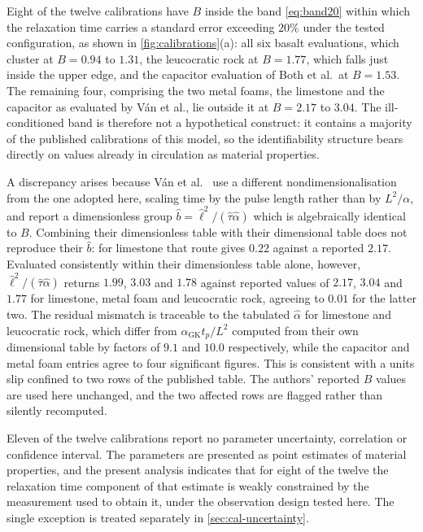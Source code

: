 \documentclass[preprint,12pt,a4paper]{elsarticle}
\theoremstyle{plain}
\theoremstyle{definition}
\theoremstyle{remark}
\newcommand{\Bnum}{B}
\begin{document}
Eight of the twelve calibrations have $\Bnum$ inside the band
\eqref{eq:band20} within which the relaxation time carries a standard error
exceeding $20\%$ under the tested configuration, as shown in \cref{fig:calibrations}(a): all six basalt evaluations,
which cluster at $\Bnum = 0.94$ to $1.31$, the leucocratic rock at
$\Bnum = 1.77$, which falls just inside the upper edge, and the capacitor
evaluation of Both et al.\ at $\Bnum = 1.53$. The remaining four, comprising
the two metal foams, the limestone and the capacitor as evaluated by V\'an
et al., lie outside it at $\Bnum = 2.17$ to $3.04$. The ill-conditioned band is
therefore not a hypothetical construct: it contains a majority of the published
calibrations of this model, so the identifiability structure bears directly on
values already in circulation as material properties.


A discrepancy arises because V\'an et al.\ \cite{Van2017} use a different
nondimensionalisation from the one adopted here, scaling time by the pulse
length rather than by $L^{2}/\alpha$, and report a dimensionless group
$\hat{b} = \hat{\ell}^{2}/(\hat{\tau}\hat{\alpha})$ which is algebraically
identical to $\Bnum$. Combining their dimensionless table with their
dimensional table does not reproduce their $\hat{b}$: for limestone that route
gives $0.22$ against a reported $2.17$. Evaluated consistently within their
dimensionless table alone, however, $\hat{\ell}^{2}/(\hat{\tau}\hat{\alpha})$
returns $1.99$, $3.03$ and $1.78$ against reported values of $2.17$, $3.04$ and
$1.77$ for limestone, metal foam and leucocratic rock, agreeing to $0.01$ for
the latter two. The residual mismatch is traceable to the tabulated
$\hat{\alpha}$ for limestone and leucocratic rock, which differ from
$\alpha_{\mathrm{GK}} t_{p}/L^{2}$ computed from their own dimensional table by
factors of $9.1$ and $10.0$ respectively, while the capacitor and metal foam
entries agree to four significant figures. This is consistent with a units slip
confined to two rows of the published table. The authors' reported $\Bnum$
values are used here unchanged, and the two affected rows are flagged rather
than silently recomputed.

Eleven of the twelve calibrations report no parameter
uncertainty, correlation or confidence interval. The parameters are presented
as point estimates of material properties, and the present analysis indicates
that for eight of the twelve the relaxation time component of that estimate is
weakly constrained by the measurement used to obtain it, under the observation
design tested here. The single exception is treated separately in
\cref{sec:cal-uncertainty}.
\end{document}

